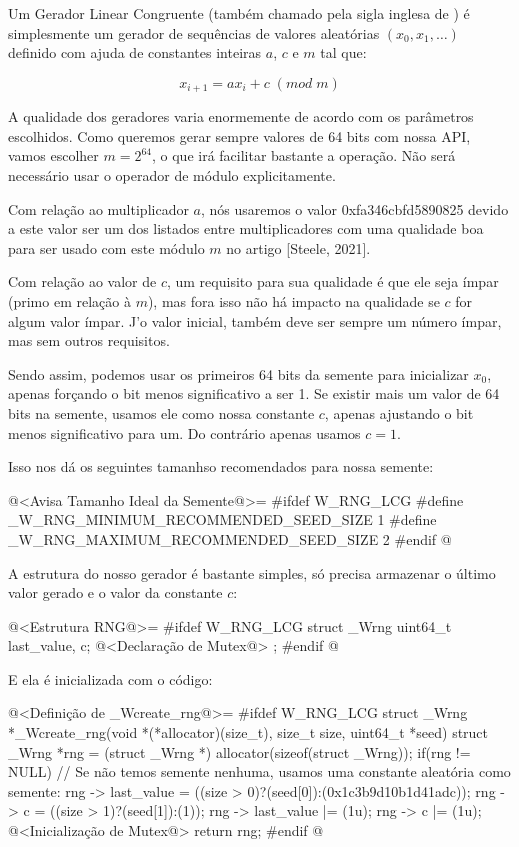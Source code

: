 

Um Gerador Linear Congruente (também chamado pela sigla inglesa
de ) é simplesmente um gerador de
sequências de valores aleatórias $(x_0, x_1, \ldots)$ definido com
ajuda de constantes inteiras $a$, $c$ e $m$ tal que:

$$
x_{i+1}=ax_i+c\; (mod\; m)
$$

A qualidade dos geradores varia enormemente de acordo com os
parâmetros escolhidos. Como queremos gerar sempre valores de 64 bits
com nossa API, vamos escolher $m=2^{64}$, o que irá facilitar bastante
a operação. Não será necessário usar o operador de módulo
explicitamente.

Com relação ao multiplicador $a$, nós usaremos o valor
0xfa346cbfd5890825 devido a este valor ser um dos listados entre
multiplicadores com uma qualidade boa para ser usado com este módulo
$m$ no artigo [Steele, 2021].

Com relação ao valor de $c$, um requisito para sua qualidade é que ele
seja ímpar (primo em relação à $m$), mas fora isso não há impacto na
qualidade se $c$ for algum valor ímpar. J'o valor inicial, também deve
ser sempre um número ímpar, mas sem outros requisitos.

Sendo assim, podemos usar os primeiros 64 bits da semente para
inicializar $x_0$, apenas forçando o bit menos significativo a ser
1. Se existir mais um valor de 64 bits na semente, usamos ele como
nossa constante $c$, apenas ajustando o bit menos significativo para
um. Do contrário apenas usamos $c=1$.

Isso nos dá os seguintes tamanhso recomendados para nossa semente:

\iniciocodigo
@<Avisa Tamanho Ideal da Semente@>=
#ifdef W_RNG_LCG
#define _W_RNG_MINIMUM_RECOMMENDED_SEED_SIZE  1
#define _W_RNG_MAXIMUM_RECOMMENDED_SEED_SIZE  2
#endif
@
\fimcodigo

A estrutura do nosso gerador é bastante simples, só precisa armazenar
o último valor gerado e o valor da constante $c$:

\iniciocodigo
@<Estrutura RNG@>=
#ifdef W_RNG_LCG
struct _Wrng{
  uint64_t last_value, c;
  @<Declaração de Mutex@>
};
#endif
@
\fimcodigo

E ela é inicializada com o código:

\iniciocodigo
@<Definição de \_Wcreate\_rng@>=
#ifdef W_RNG_LCG
struct _Wrng *_Wcreate_rng(void *(*allocator)(size_t), size_t size,
                           uint64_t *seed){
  struct _Wrng *rng = (struct _Wrng *) allocator(sizeof(struct _Wrng));
  if(rng != NULL){
    // Se não temos semente nenhuma, usamos uma constante aleatória como semente:
    rng -> last_value = ((size > 0)?(seed[0]):(0x1c3b9d10b1d41adc));
    rng -> c = ((size > 1)?(seed[1]):(1));
    rng -> last_value |= (1u);
    rng -> c |= (1u);
    @<Inicialização de Mutex@>
  }
  return rng;
}
#endif
@
\fimcodigo

